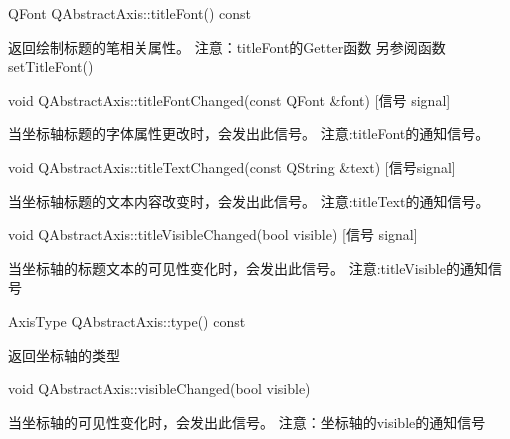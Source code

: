 QFont QAbstractAxis::titleFont() const 

返回绘制标题的笔相关属性。 注意：titleFont的Getter函数 另参阅函数setTitleFont()

void QAbstractAxis::titleFontChanged(const QFont \&font) [信号 signal]

当坐标轴标题的字体属性更改时，会发出此信号。 注意:titleFont的通知信号。

void QAbstractAxis::titleTextChanged(const QString \&text) [信号signal] 

当坐标轴标题的文本内容改变时，会发出此信号。 注意:titleText的通知信号。

void QAbstractAxis::titleVisibleChanged(bool visible) [信号 signal] 

当坐标轴的标题文本的可见性变化时，会发出此信号。 注意:titleVisible的通知信号

AxisType QAbstractAxis::type() const 

返回坐标轴的类型

void QAbstractAxis::visibleChanged(bool visible) 

当坐标轴的可见性变化时，会发出此信号。 注意：坐标轴的visible的通知信号

